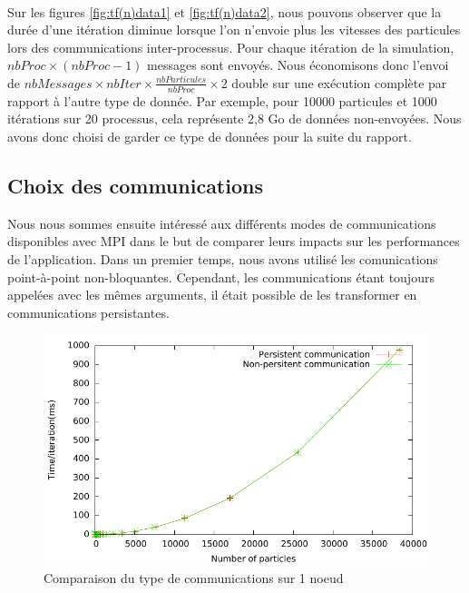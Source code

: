 \documentclass{article}
\begin{document}
\paragraph{}
Sur les figures \ref{fig:tf(n)data1} et \ref{fig:tf(n)data2}, nous pouvons observer que la durée d'une itération diminue lorsque l'on n'envoie plus les vitesses des particules lors des communications inter-processus. Pour chaque itération de la simulation, $ nbProc \times (nbProc - 1) $ messages sont envoyés. Nous économisons donc l'envoi de $ nbMessages \times nbIter \times \frac{nbParticules}{nbProc} \times 2 $ double sur une exécution complète par rapport à l'autre type de donnée. Par exemple, pour 10000 particules et 1000 itérations sur 20 processus, cela représente 2,8 Go de données non-envoyées. Nous avons donc choisi de garder ce type de données pour la suite du rapport.

\newpage

\subsection{Choix des communications}
Nous nous sommes ensuite intéressé aux différents modes de communications disponibles avec MPI dans le but de comparer leurs impacts sur les performances de l'application. Dans un premier temps, nous avons utilisé les comunications point-à-point non-bloquantes. Cependant, les communications étant toujours appelées avec les mêmes arguments, il était possible de les transformer en communications persistantes.

\begin{figure}[h]
  \centering
  \includegraphics[scale=0.7]{ResultTDP2/mpi_comm/mpi_comm_singlenode.pdf}
  \caption{\label{fig:tf(n)1}Comparaison du type de communications sur 1 noeud}
\end{figure}
\end{document}
